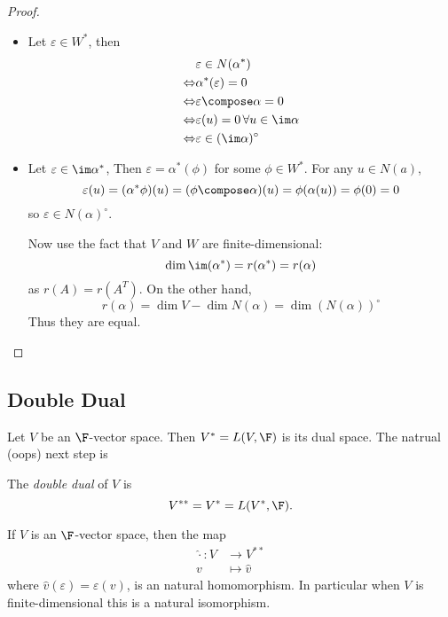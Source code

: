 \documentclass[a4paper]{article}
\newcommand*{\ann}{\circ}
\theoremstyle{definition}
\begin{document}
\begin{proof}\leavevmode
  \begin{itemize}
  \item Let \(\varepsilon \in W^*\), then
  \begin{align*}
    & \varepsilon \in N(\alpha^*) \\
    \Leftrightarrow & \alpha^* (\varepsilon) = 0 \\
    \Leftrightarrow & \varepsilon \compose \alpha = 0 \\
    \Leftrightarrow & \varepsilon(u) = 0 \, \forall u \in \im \alpha \\
    \Leftrightarrow & \varepsilon \in (\im \alpha)^\ann
  \end{align*}

\item Let \(\varepsilon \in \im \alpha^*\), Then \(\varepsilon = \alpha^* (\phi)\) for some \(\phi \in W^*\). For any \(u \in N(a)\),
  \[
    \varepsilon(u) = (\alpha^* \phi)(u) = (\phi\compose \alpha)(u) = \phi(\alpha(u)) = \phi(0) = 0
  \]
  so \(\varepsilon \in N(\alpha)^\ann\).

  Now use the fact that \(V\) and \(W\) are finite-dimensional:
  \[
    \dim \im(\alpha^*) = r(\alpha^*) = r(\alpha)
  \]
  as \(r(A) = r(A^T)\). On the other hand,
  \[
    r(\alpha) = \dim V - \dim N(\alpha) = \dim (N(\alpha))^\ann
  \]
  Thus they are equal.
\end{itemize}
\end{proof}

\subsection{Double Dual}

Let \(V\) be an \(\F\)-vector space. Then \(V^* = L(V,\F)\) is its dual space. The natrual (oops) next step is

\begin{definition}
  The \emph{double dual} of \(V\) is
  \[
    V^{**} = V^* = L(V^*, \F).
  \]
\end{definition}

\begin{theorem}
  If \(V\) is an \(\F\)-vector space, then the map
  \begin{align*}
    \hat \cdot: V &\to V^{**} \\
    v &\mapsto \hat v
  \end{align*}
  where \(\hat v(\varepsilon) = \varepsilon(v)\), is an natural homomorphism. In particular when \(V\) is finite-dimensional this is a natural isomorphism.
\end{theorem}
\end{document}
